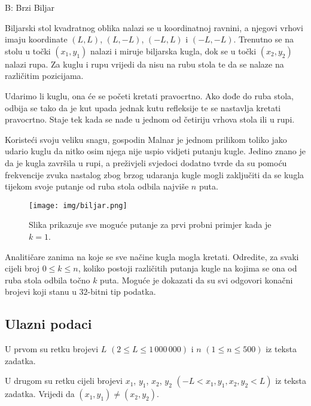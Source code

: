 \begin{statement}[
  timelimit=1 s,
  memorylimit=512 MiB,
]{B: Brzi Biljar}

Biljarski stol kvadratnog oblika nalazi se u koordinatnoj ravnini, a njegovi
vrhovi imaju koordinate $(L,L)$, $(L,-L)$, $(-L,L)$ i $(-L,-L)$. Trenutno se
na stolu u točki $(x_1, y_1)$ nalazi i miruje biljarska kugla, dok se u točki
$(x_2, y_2)$ nalazi rupa. Za kuglu i rupu vrijedi da nisu na rubu stola te da
se nalaze na različitim pozicijama.

Udarimo li kuglu, ona će se početi kretati pravocrtno. Ako dođe do ruba stola,
odbija se tako da je kut upada jednak kutu refleksije te se nastavlja kretati
pravocrtno. Staje tek kada se nađe u jednom od četiriju vrhova stola ili u
rupi.

Koristeći svoju veliku snagu, gospodin Malnar je jednom prilikom toliko jako
udario kuglu da nitko osim njega nije uspio vidjeti putanju kugle. Jedino
znano je da je kugla završila u rupi, a preživjeli svjedoci dodatno tvrde da
su pomoću frekvencije zvuka nastalog zbog brzog udaranja kugle mogli
zaključiti da se kugla tijekom svoje putanje od ruba stola odbila najviše $n$
puta.

\begin{figure}[h]
\centering
\texttt{[image: img/biljar.png]}
\caption{Slika prikazuje sve moguće putanje za prvi probni primjer kada je $k=1$.}
\end{figure}

Analitičare zanima na koje se sve načine kugla mogla kretati. Odredite, za
svaki cijeli broj $0 \le k \le n$, koliko postoji različitih putanja kugle na
kojima se ona od ruba stola odbila točno $k$ puta. Moguće je dokazati da su
svi odgovori konačni brojevi koji stanu u $32$-bitni tip podatka.

\subsection*{Ulazni podaci}
U prvom su retku brojevi $L$ $(2 \le L \le 1\,000\,000)$ i $n$ $(1 \le n \le
500)$ iz teksta zadatka.

U drugom su retku cijeli brojevi $x_1$, $y_1$, $x_2$, $y_2$ $(-L < x_1,
y_1, x_2, y_2 < L)$ iz teksta zadatka. Vrijedi da $(x_1, y_1) \ne (x_2, y_2)$.


\end{statement}
